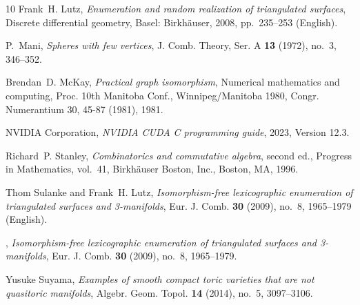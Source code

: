 \documentclass[11pt]{amsart}
\theoremstyle{plain}
\numberwithin{equation}{section}
\theoremstyle{definition}
\begin{document}
\begin{thebibliography}{10}
	Frank~H. Lutz, \emph{Enumeration and random realization of triangulated
		surfaces}, Discrete differential geometry, Basel: Birkh{\"a}user, 2008,
	pp.~235--253 (English).
	
	P.~Mani, \emph{Spheres with few vertices}, J. Comb. Theory, Ser. {A}
	\textbf{13} (1972), no.~3, 346--352.
	
	Brendan~D. McKay, \emph{Practical graph isomorphism}, Numerical mathematics and
	computing, {Proc}. 10th {Manitoba} {Conf}., {Winnipeg}/{Manitoba} 1980,
	{Congr}. {Numerantium} 30, 45-87 (1981), 1981.
	
	{NVIDIA Corporation}, \emph{{NVIDIA CUDA C} programming guide}, 2023, Version
	12.3.
	
	Richard~P. Stanley, \emph{Combinatorics and commutative algebra}, second ed.,
	Progress in Mathematics, vol.~41, Birkh\"auser Boston, Inc., Boston, MA,
	1996. 
	
	Thom Sulanke and Frank~H. Lutz, \emph{Isomorphism-free lexicographic
		enumeration of triangulated surfaces and 3-manifolds}, Eur. J. Comb.
	\textbf{30} (2009), no.~8, 1965--1979 (English).
	
	\bysame, \emph{Isomorphism-free lexicographic enumeration of triangulated
		surfaces and 3-manifolds}, Eur. J. Comb. \textbf{30} (2009), no.~8,
	1965--1979. 
	
	Yusuke Suyama, \emph{Examples of smooth compact toric varieties that are not
		quasitoric manifolds}, Algebr. Geom. Topol. \textbf{14} (2014), no.~5,
	3097--3106. 
	
\end{thebibliography}
\end{document}
